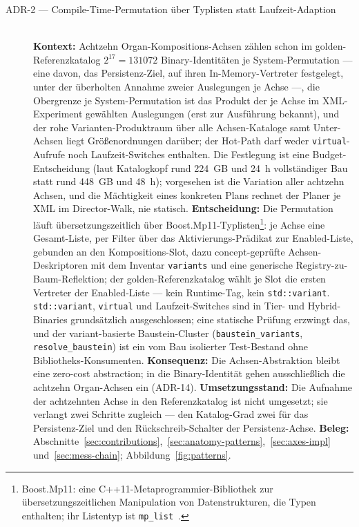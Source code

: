 \begin{description}
  \item[ADR-2 --- Compile-Time-Permutation über Typlisten statt Laufzeit-Adaption]\hfill\\
  \textbf{Kontext:} Achtzehn Organ-Kompositions-Achsen zählen schon im golden-Referenzkatalog
  $2^{17} = 131072$ Binary-Identitäten je System-Permutation --- eine davon, das Persistenz-Ziel, auf ihren
  In-Memory-Vertreter festgelegt, unter der überholten Annahme zweier Auslegungen je Achse ---, die Obergrenze
  je System-Permutation ist das Produkt der je Achse im XML-Experiment gewählten Auslegungen (erst zur
  Ausführung bekannt), und der rohe Varianten-Produktraum über alle Achsen-Kataloge samt Unter-Achsen liegt
  Größenordnungen darüber;
  der Hot-Path darf weder \texttt{virtual}-Aufrufe noch Laufzeit-Switches enthalten. Die Festlegung ist eine
  Budget-Entscheidung (laut Katalogkopf rund 224~GB und 24~h vollständiger Bau statt rund 448~GB und
  48~h); vorgesehen ist die Variation aller achtzehn Achsen, und die Mächtigkeit eines konkreten Plans
  rechnet der Planer je XML im Director-Walk, nie statisch.
  \textbf{Entscheidung:} Die Permutation läuft übersetzungszeitlich über
  Boost.Mp11-Typlisten\footnote{Boost.Mp11: eine C++11-Metaprogrammier-Bibliothek zur
  übersetzungszeitlichen Manipulation von Datenstrukturen, die Typen enthalten; ihr Listentyp ist
  \texttt{mp\_list}~\cite{dimov_mp11}.}: je Achse eine Gesamt-Liste, per Filter über das
  Aktivierungs-Prädikat zur Enabled-Liste, gebunden an den Kompositions-Slot, dazu concept-geprüfte
  Achsen-Deskriptoren mit dem Inventar \texttt{variants} und eine generische Registry-zu-Baum-Reflektion;
  der golden-Referenzkatalog wählt je Slot die ersten Vertreter der Enabled-Liste --- kein
  Runtime-Tag, kein \texttt{std::variant}. \texttt{std::variant}, \texttt{virtual} und
  Laufzeit-Switches sind in Tier- und Hybrid-Binaries grundsätzlich ausgeschlossen; eine
  statische Prüfung erzwingt das, und der variant-basierte Baustein-Cluster
  (\texttt{baustein\_variants}, \texttt{resolve\_baustein}) ist ein vom Bau isolierter Test-Bestand ohne
  Bibliotheks-Konsumenten.
  \textbf{Konsequenz:} Die Achsen-Abstraktion bleibt eine zero-cost abstraction; in die
  Binary-Identität gehen ausschließlich die achtzehn Organ-Achsen ein (ADR-14).
  \textbf{Umsetzungsstand:} Die Aufnahme der achtzehnten Achse in den Referenzkatalog ist nicht umgesetzt;
  sie verlangt zwei Schritte zugleich --- den Katalog-Grad zwei für das Persistenz-Ziel und den
  Rückschreib-Schalter der Persistenz-Achse.
  \textbf{Beleg:} Abschnitte~\ref{sec:contributions},~\ref{sec:anatomy-patterns},~\ref{sec:axes-impl}
  und~\ref{sec:mess-chain}; Abbildung~\ref{fig:patterns}.


\end{description}
